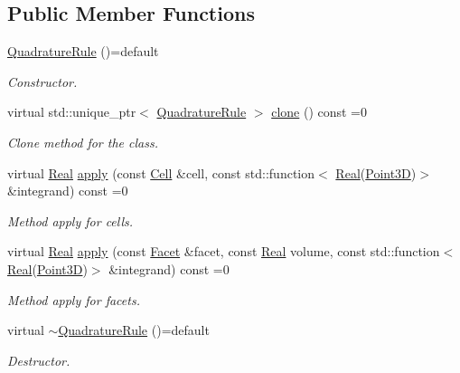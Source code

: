 \subsection*{Public Member Functions}
\begin{DoxyCompactItemize}
\item 
\hyperlink{classFVCode3D_1_1QuadratureRule_a3eeb28f09a0f1bd920790698bf309192}{Quadrature\+Rule} ()=default
\begin{DoxyCompactList}\small\item\em Constructor. \end{DoxyCompactList}\item 
virtual std\+::unique\+\_\+ptr$<$ \hyperlink{classFVCode3D_1_1QuadratureRule}{Quadrature\+Rule} $>$ \hyperlink{classFVCode3D_1_1QuadratureRule_a15713ebb7a5e7fb1a976a53fd0993415}{clone} () const =0
\begin{DoxyCompactList}\small\item\em Clone method for the class. \end{DoxyCompactList}\item 
virtual \hyperlink{namespaceFVCode3D_a40c1f5588a248569d80aa5f867080e83}{Real} \hyperlink{classFVCode3D_1_1QuadratureRule_ab4dc6fefb61b96da71e47426985aa29b}{apply} (const \hyperlink{classFVCode3D_1_1QuadratureRule_af2f37bb8e8b8c3fd7554eaacaf4e5f3c}{Cell} \&cell, const std\+::function$<$ \hyperlink{namespaceFVCode3D_a40c1f5588a248569d80aa5f867080e83}{Real}(\hyperlink{classFVCode3D_1_1Point3D}{Point3D})$>$ \&integrand) const =0
\begin{DoxyCompactList}\small\item\em Method apply for cells. \end{DoxyCompactList}\item 
virtual \hyperlink{namespaceFVCode3D_a40c1f5588a248569d80aa5f867080e83}{Real} \hyperlink{classFVCode3D_1_1QuadratureRule_a411b60c117b987cc024949c697ac31a1}{apply} (const \hyperlink{classFVCode3D_1_1QuadratureRule_af6e825c3626d437e50e5da733cd0ca1b}{Facet} \&facet, const \hyperlink{namespaceFVCode3D_a40c1f5588a248569d80aa5f867080e83}{Real} volume, const std\+::function$<$ \hyperlink{namespaceFVCode3D_a40c1f5588a248569d80aa5f867080e83}{Real}(\hyperlink{classFVCode3D_1_1Point3D}{Point3D})$>$ \&integrand) const =0
\begin{DoxyCompactList}\small\item\em Method apply for facets. \end{DoxyCompactList}\item 
virtual \hyperlink{classFVCode3D_1_1QuadratureRule_a01d4ee373abeb8f05c37626aee4a4b50}{$\sim$\+Quadrature\+Rule} ()=default
\begin{DoxyCompactList}\small\item\em Destructor. \end{DoxyCompactList}\end{DoxyCompactItemize}


